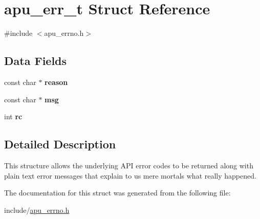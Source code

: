 \hypertarget{structapu__err__t}{\section{apu\-\_\-err\-\_\-t Struct Reference}
\label{structapu__err__t}
}


{\ttfamily \#include $<$apu\-\_\-errno.\-h$>$}

\subsection*{Data Fields}
\begin{DoxyCompactItemize}
\item 
\hypertarget{structapu__err__t_a16327ba93834bf8f4a13663a714caa0b}{const char $\ast$ {\bfseries reason}}\label{structapu__err__t_a16327ba93834bf8f4a13663a714caa0b}

\item 
\hypertarget{structapu__err__t_a00fa3bec74e3dff959ca0d774c35e8de}{const char $\ast$ {\bfseries msg}}\label{structapu__err__t_a00fa3bec74e3dff959ca0d774c35e8de}

\item 
\hypertarget{structapu__err__t_a37afb348f7541d37cce9478769f02304}{int {\bfseries rc}}\label{structapu__err__t_a37afb348f7541d37cce9478769f02304}

\end{DoxyCompactItemize}


\subsection{Detailed Description}
This structure allows the underlying A\-P\-I error codes to be returned along with plain text error messages that explain to us mere mortals what really happened. 

The documentation for this struct was generated from the following file\-:\begin{DoxyCompactItemize}
\item 
include/\hyperlink{apu__errno_8h}{apu\-\_\-errno.\-h}\end{DoxyCompactItemize}
